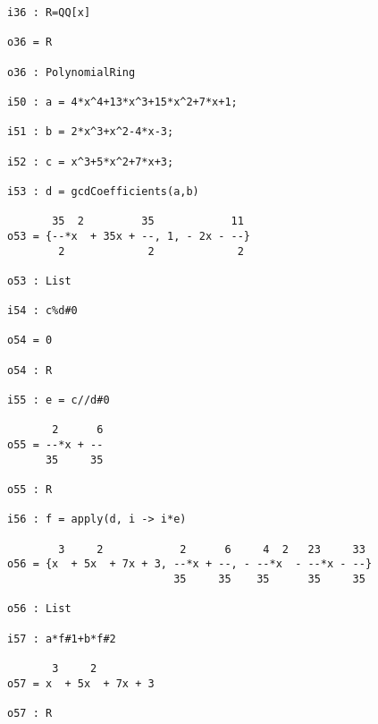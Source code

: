 \begin{comment}
{\small\begin{verbatim}
i36 : R=QQ[x]

o36 = R

o36 : PolynomialRing

i37 : a = 4*x^4+13*x^3+15*x^2+7*x+1

        4      3      2
o37 = 4x  + 13x  + 15x  + 7x + 1

o37 : R

i38 : b = 2*x^3+x^2-4*x-3

        3    2
o38 = 2x  + x  - 4x - 3

o38 : R

i39 : a//b

           11
o39 = 2x + --
            2

o39 : R

i40 : a%b

      35  2         35
o40 = --*x  + 35x + --
       2             2

o40 : R

i41 : b//(a%b)

       4      6
o41 = --*x - --
      35     35

o41 : R

i42 : b%(a%b)

o42 = 0

o42 : R

\end{verbatim}}
\end{comment}

{\small\begin{verbatim}
i36 : R=QQ[x]

o36 = R

o36 : PolynomialRing

i50 : a = 4*x^4+13*x^3+15*x^2+7*x+1;

i51 : b = 2*x^3+x^2-4*x-3;

i52 : c = x^3+5*x^2+7*x+3;

i53 : d = gcdCoefficients(a,b)

       35  2         35            11
o53 = {--*x  + 35x + --, 1, - 2x - --}
        2             2             2

o53 : List

i54 : c%d#0

o54 = 0

o54 : R

i55 : e = c//d#0

       2      6
o55 = --*x + --
      35     35

o55 : R

i56 : f = apply(d, i -> i*e)

        3     2            2      6     4  2   23     33
o56 = {x  + 5x  + 7x + 3, --*x + --, - --*x  - --*x - --}
                          35     35    35      35     35

o56 : List

i57 : a*f#1+b*f#2

       3     2
o57 = x  + 5x  + 7x + 3

o57 : R

\end{verbatim}}


